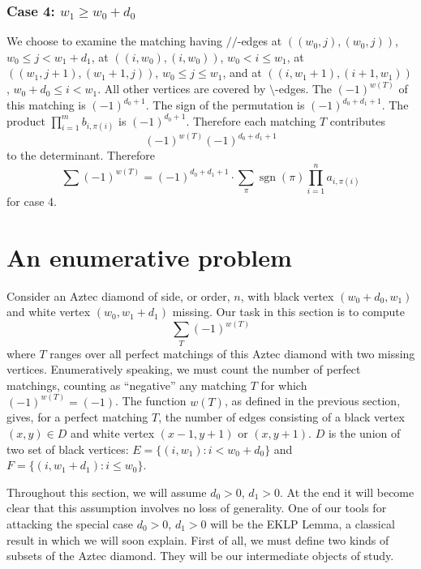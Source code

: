 \documentclass[10pt,reqno]{amsart}
\theoremstyle{plain}
\theoremstyle{definition}
\theoremstyle{remark}
\DeclareMathOperator{\sgn }{sgn }
\begin{document}
\subsubsection{Case 4: $w_1\geq w_0+d_0$}

We choose to examine the matching having $//$-edges at
$((w_0,j),(w_0,j))$, $w_0\leq j<w_1+d_1$, at
$((i,w_0),(i,w_0))$, $w_0<i\leq w_1$, at
$((w_1,j+1),(w_1+1,j))$, $w_0\leq j\leq w_1$, and at
$((i,w_1+1),(i+1,w_1))$, $w_0+d_0\leq i<w_1$.
All other vertices are covered by $\setminus$-edges. 
The $(-1)^{w(T)}$ of this matching is
$(-1)^{d_0+1}$. The sign of the
permutation is $(-1)^{d_0+d_1+1}$.
The product 
$\prod_{i=1}^m b_{i,\pi(i)}$  is $(-1)^{d_0+1}$. Therefore each matching
$T$ contributes \begin{equation} (-1)^{w(T)} (-1)^{d_0+d_1+1}\end{equation}
to the determinant.
Therefore
\[ 
\sum (-1)^{w(T)} = (-1)^{d_0+d_1+1}\cdot 
\sum_{\pi } \sgn(\pi ) \prod_{i=1}^n a_{i,\pi(i)} \] for case 4.

\section{An enumerative problem}

Consider an
Aztec diamond of side, or order, $n$, with black vertex $(w_0+d_0,w_1)$
and white vertex $(w_0,w_1+d_1)$ missing. Our task in this section is
 to compute \begin{equation} \sum_T (-1)^{w(T)} \end{equation}
where $T$ ranges over all perfect matchings of this Aztec diamond
with two missing vertices.
Enumeratively speaking, we must count the number of perfect
matchings, counting as ``negative'' any matching $T$
for which $(-1)^{w(T)}=(-1)$. The function $w(T)$, 
as defined in the previous section,
gives, for a perfect matching
$T$, 
the number of edges consisting of a black vertex $(x,y)\in D$
and white vertex $(x-1,y+1)$ or $(x,y+1)$. $D$ is the union of two
set of black vertices: $E = \{(i,w_1) : i<w_0+d_0\}$ and 
$F = \{(i,w_1+d_1) : i\leq w_0\}$.

Throughout this section, we will assume $d_0>0$, $d_1>0$. At the end it
will become clear that this assumption involves no loss of generality.
One of our tools for attacking the special case $d_0>0$, $d_1>0$ will be
the EKLP Lemma, a classical result in \cite{EKLP} which we will
soon explain. First of all, we must define two kinds of subsets of the 
Aztec diamond. They will be our intermediate objects of study.
\end{document}

